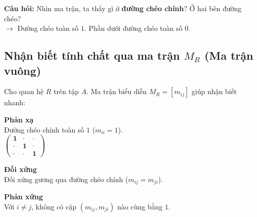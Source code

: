 \documentclass[12pt,a4paper]{article}
\begin{document}
\textbf{Câu hỏi:} Nhìn ma trận, ta thấy gì ở \textbf{đường chéo chính}? Ở hai bên đường chéo?\\
$\rightarrow$ Đường chéo toàn số $1$. Phần dưới đường chéo toàn số $0$.

\subsection{Nhận biết tính chất qua ma trận \texorpdfstring{$M_R$}{MR} (Ma trận vuông)}

Cho quan hệ $R$ trên tập $A$. Ma trận biểu diễn $M_R = [m_{ij}]$ giúp nhận biết nhanh:

\noindent
\begin{minipage}[t]{0.31\textwidth}
\centering
\textbf{\textcolor{AccentRed}{Phản xạ}}\\[3pt]
{\small Đường chéo chính toàn số $1$ ($m_{ii} = 1$).}\\[6pt]
$\begin{pmatrix}
  \mathbf{1} & \cdot & \cdot \\
  \cdot & \mathbf{1} & \cdot \\
  \cdot & \cdot & \mathbf{1}
\end{pmatrix}$
\end{minipage}
\hfill
\begin{minipage}[t]{0.33\textwidth}
\centering
\textbf{\textcolor{PrimaryBlue}{Đối xứng}}\\[3pt]
{\small Đối xứng gương qua đường chéo chính ($m_{ij} = m_{ji}$).}\\[6pt]
\end{minipage}
\hfill
\begin{minipage}[t]{0.33\textwidth}
\centering
\textbf{\textcolor{AccentGreen}{Phản xứng}}\\[3pt]
{\small Với $i \neq j$, không có cặp $(m_{ij}, m_{ji})$ nào cùng bằng $1$.}\\[6pt]
\end{minipage}
\end{document}
